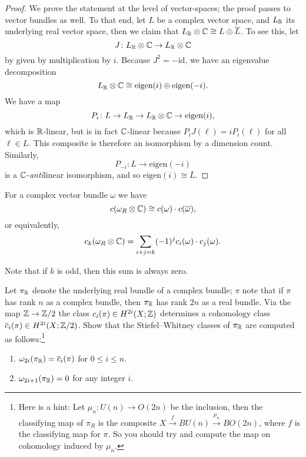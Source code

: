 \documentclass[ma3408.tex]{subfiles}
\begin{document}
\begin{proof}
We prove the statement at the level of vector-spaces; the proof passes to vector bundles as well. To that end, let $L$ be a complex vector space, and $L_{\mathbb{R}}$ its underlying real vector space, then we claim that $L_{\mathbb{R}} \otimes \mathbb{C} \cong L \oplus \overline{L}$. To see this, let 
\[
J \colon L_{\mathbb{R}} \otimes \mathbb{C} \to L_{\mathbb{R}} \otimes \mathbb{C} 
\]
by given by multiplication by $i$. Because $J^2 = -\text{id}$, we have an eigenvalue decomposition
\[
L_{\mathbb{R}} \otimes \mathbb{C} \cong \text{eigen}(i) \oplus \text{eigen}(-i). 
\]
We have a map
\[
P_i \colon L \to L_{\mathbb{R}} \to L_{\mathbb{R}} \otimes \mathbb{C} \to \text{eigen}(i),
\]
which is $\mathbb{R}$-linear, but is in fact $\mathbb{C}$-linear because $P_iJ(\ell) = iP_i(\ell)$ for all $\ell \in L$. This composite is therefore an isomorphism by a dimension count. Similarly, 
\[
P_{-i} \colon L \to \text{eigen}(-i)
\]
is a $\mathbb{C}$-\emph{anti}linear isomorphism, and so $\text{eigen}(i) \cong \overline{L}$. 
\end{proof}
\begin{Cor}
For a complex vector bundle $\omega$ we have
\[
c(\omega_R \otimes \mathbb{C}) \cong c(\omega)\cdot c(\overline{\omega}),
\]
or equivalently,
\[
c_k(\omega_R \otimes\mathbb{C}) = \sum_{i+j = k}(-1)^j c_i(\omega) \cdot c_j(\omega).
\]
\end{Cor}
\begin{Rem}
Note that if $k$ is odd, then this sum is always zero. 
\end{Rem}
\begin{exercise}\label{exercise:underlying-real}
Let $\pi_{\mathbb{R}}$ denote the underlying real bundle of a complex bundle; $\pi$ note that if $\pi$ has rank $n$ as a complex bundle, then $\pi_{\mathbb{R}}$ has rank $2n$ as a real bundle. Via the map $\mathbb{Z} \to \mathbb{Z}/2$ the class $c_i(\pi) \in H^{2i}(X;\mathbb{Z})$ determines a cohomology class $\overline{c}_i(\pi) \in H^{2i}(X;\mathbb{Z}/2)$. Show that the Stiefel--Whitney classes of $\pi_{\mathbb{R}}$ are computed as follows:\footnote{Here is a hint: Let $\mu_n \colon U(n) \to O(2n)$ be the inclusion, then the classifying map of $\pi_R$ is the composite $X \xrightarrow{f} BU(n) \xrightarrow{\mu_n} BO(2n)$, where $f$ is the classifying map for $\pi$. So you should try and compute the map on cohomology induced by $\mu_n$.}
\begin{enumerate}
    \item $\omega_{2i}(\pi_{\mathbb{R}}) = \overline{c}_i(\pi)$ for $0 \le i \le n$.
    \item $\omega_{2i+1}(\pi_{\mathbb{R}}) = 0$ for any integer $i$. 
\end{enumerate}
\end{exercise}
\end{document}
